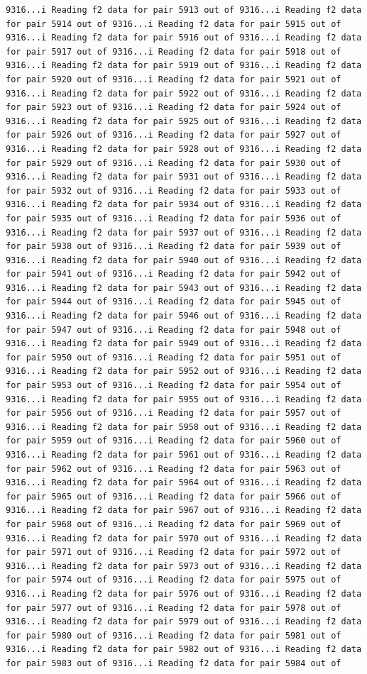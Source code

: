 \documentclass[
]{article}
\begin{document}
\begin{verbatim}
9316...i Reading f2 data for pair 5913 out of 9316...i Reading f2 data for pair 5914 out of 9316...i Reading f2 data for pair 5915 out of 9316...i Reading f2 data for pair 5916 out of 9316...i Reading f2 data for pair 5917 out of 9316...i Reading f2 data for pair 5918 out of 9316...i Reading f2 data for pair 5919 out of 9316...i Reading f2 data for pair 5920 out of 9316...i Reading f2 data for pair 5921 out of 9316...i Reading f2 data for pair 5922 out of 9316...i Reading f2 data for pair 5923 out of 9316...i Reading f2 data for pair 5924 out of 9316...i Reading f2 data for pair 5925 out of 9316...i Reading f2 data for pair 5926 out of 9316...i Reading f2 data for pair 5927 out of 9316...i Reading f2 data for pair 5928 out of 9316...i Reading f2 data for pair 5929 out of 9316...i Reading f2 data for pair 5930 out of 9316...i Reading f2 data for pair 5931 out of 9316...i Reading f2 data for pair 5932 out of 9316...i Reading f2 data for pair 5933 out of 9316...i Reading f2 data for pair 5934 out of 9316...i Reading f2 data for pair 5935 out of 9316...i Reading f2 data for pair 5936 out of 9316...i Reading f2 data for pair 5937 out of 9316...i Reading f2 data for pair 5938 out of 9316...i Reading f2 data for pair 5939 out of 9316...i Reading f2 data for pair 5940 out of 9316...i Reading f2 data for pair 5941 out of 9316...i Reading f2 data for pair 5942 out of 9316...i Reading f2 data for pair 5943 out of 9316...i Reading f2 data for pair 5944 out of 9316...i Reading f2 data for pair 5945 out of 9316...i Reading f2 data for pair 5946 out of 9316...i Reading f2 data for pair 5947 out of 9316...i Reading f2 data for pair 5948 out of 9316...i Reading f2 data for pair 5949 out of 9316...i Reading f2 data for pair 5950 out of 9316...i Reading f2 data for pair 5951 out of 9316...i Reading f2 data for pair 5952 out of 9316...i Reading f2 data for pair 5953 out of 9316...i Reading f2 data for pair 5954 out of 9316...i Reading f2 data for pair 5955 out of 9316...i Reading f2 data for pair 5956 out of 9316...i Reading f2 data for pair 5957 out of 9316...i Reading f2 data for pair 5958 out of 9316...i Reading f2 data for pair 5959 out of 9316...i Reading f2 data for pair 5960 out of 9316...i Reading f2 data for pair 5961 out of 9316...i Reading f2 data for pair 5962 out of 9316...i Reading f2 data for pair 5963 out of 9316...i Reading f2 data for pair 5964 out of 9316...i Reading f2 data for pair 5965 out of 9316...i Reading f2 data for pair 5966 out of 9316...i Reading f2 data for pair 5967 out of 9316...i Reading f2 data for pair 5968 out of 9316...i Reading f2 data for pair 5969 out of 9316...i Reading f2 data for pair 5970 out of 9316...i Reading f2 data for pair 5971 out of 9316...i Reading f2 data for pair 5972 out of 9316...i Reading f2 data for pair 5973 out of 9316...i Reading f2 data for pair 5974 out of 9316...i Reading f2 data for pair 5975 out of 9316...i Reading f2 data for pair 5976 out of 9316...i Reading f2 data for pair 5977 out of 9316...i Reading f2 data for pair 5978 out of 9316...i Reading f2 data for pair 5979 out of 9316...i Reading f2 data for pair 5980 out of 9316...i Reading f2 data for pair 5981 out of 9316...i Reading f2 data for pair 5982 out of 9316...i Reading f2 data for pair 5983 out of 9316...i Reading f2 data for pair 5984 out of 
\end{verbatim}
\end{document}
